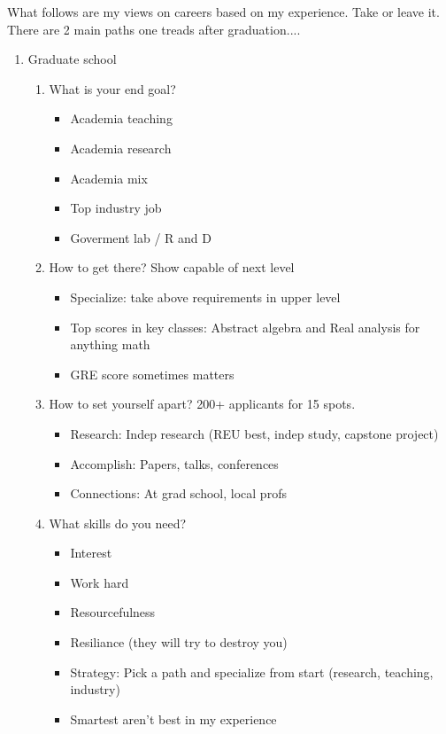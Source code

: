 \documentclass{article}
\theoremstyle{remark}
\begin{document}
What follows are my views on careers based on my experience. Take or leave it. 
There are 2 main paths one treads after graduation....

\begin{enumerate}
\item Graduate school
\begin{enumerate}

\item What is your end goal?
\begin{itemize}
\item Academia teaching
\item Academia research
\item Academia mix
\item Top industry job
\item Goverment lab / R and D
\end{itemize}

\item How to get there? Show capable of next level
\begin{itemize}
\item Specialize: take above requirements in upper level
\item Top scores in key classes: Abstract algebra and Real analysis for anything math
\item GRE score sometimes matters
\end{itemize}

\item How to set yourself apart? 200+ applicants for 15 spots.
\begin{itemize}
\item Research: Indep research (REU best, indep study, capstone project)
\item Accomplish: Papers, talks, conferences
\item Connections: At grad school, local profs
\end{itemize}

\item What skills do you need?
\begin{itemize}
\item Interest
\item Work hard
\item Resourcefulness
\item Resiliance (they will try to destroy you)
\item Strategy: Pick a path and specialize from start (research, teaching, industry)
\item Smartest aren't best in my experience
\end{itemize}


\end{enumerate}
\end{enumerate}
\end{document}

